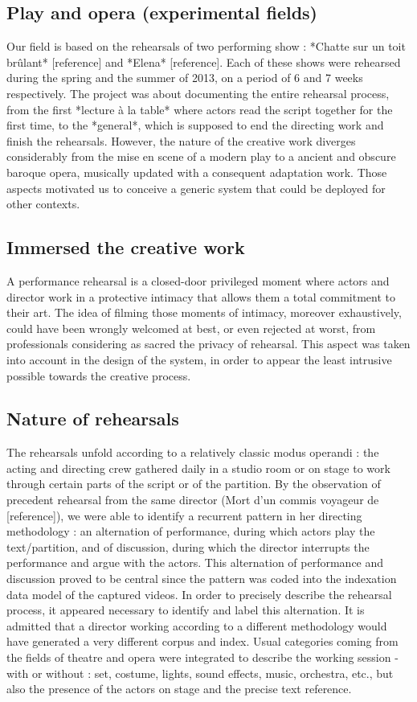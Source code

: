 \documentclass[conference]{IEEEtran}
\begin{document}
\subsection{Play and opera (experimental fields)}

Our field is based on the rehearsals of two performing show : *Chatte sur un toit brûlant* [reference] and *Elena* [reference].
Each of these shows were rehearsed during the spring and the summer of 2013, on a period of 6 and 7 weeks respectively. The project was about documenting the entire rehearsal process, from the first *lecture à la table* where actors read the script together for the first time, to the *general*, which is supposed to end the directing work and finish the rehearsals.
However, the nature of the creative work diverges considerably from the mise en scene of a modern play to a ancient and obscure baroque opera, musically updated with a consequent adaptation work.
Those aspects motivated us to conceive a generic system that could be deployed for other contexts.

\subsection{Immersed the creative work}

A performance rehearsal is a closed-door privileged moment where actors and director work in a protective intimacy that allows them a total commitment to their art. The idea of filming those moments of intimacy, moreover exhaustively, could have been wrongly welcomed at best, or even rejected at worst, from professionals considering as sacred the privacy of rehearsal.
This aspect was taken into account in the design of the system, in order to appear the least intrusive possible towards the creative process.

\subsection{Nature of rehearsals}

The rehearsals unfold according to a relatively classic modus operandi : the acting and directing crew gathered daily in a studio room or on stage to work through certain parts of the script or of the partition. By the observation of precedent rehearsal from the same director (Mort d'un commis voyageur de [reference]), we were able to identify a recurrent pattern in her directing methodology : an alternation of performance, during which actors play the text/partition, and of discussion, during which the director interrupts the performance and argue with the actors. This alternation of performance and discussion proved to be central since the pattern was coded into the indexation data model of the captured videos.
In order to precisely describe the rehearsal process, it appeared necessary to identify and label this alternation.
It is admitted that a director working according to a different methodology would have generated a very different corpus and index.
Usual categories coming from the fields of theatre and opera were integrated to describe the working session - with or without : set, costume, lights, sound effects, music, orchestra, etc., but also the presence of the actors on stage and the precise text reference.
\end{document}

